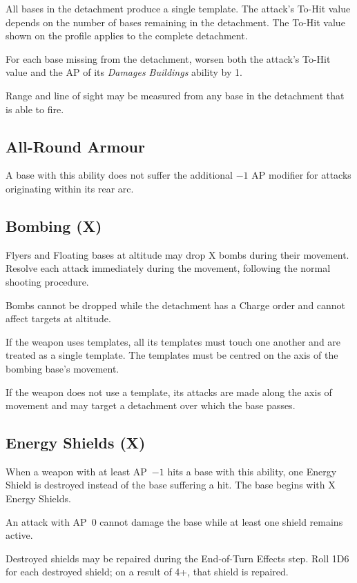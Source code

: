 All bases in the detachment produce a single template. The attack's To-Hit value depends on the number of bases remaining in the detachment. The To-Hit value shown on the profile applies to the complete detachment.

For each base missing from the detachment, worsen both the attack's To-Hit value and the AP of its \textit{Damages Buildings} ability by 1.

Range and line of sight may be measured from any base in the detachment that is able to fire.

\subsection{All-Round Armour}

A base with this ability does not suffer the additional $-1$ AP modifier for attacks originating within its rear arc.

\subsection{Bombing (X)}

Flyers and Floating bases at altitude may drop X bombs during their movement. Resolve each attack immediately during the movement, following the normal shooting procedure.

Bombs cannot be dropped while the detachment has a Charge order and cannot affect targets at altitude.

If the weapon uses templates, all its templates must touch one another and are treated as a single template. The templates must be centred on the axis of the bombing base's movement.

If the weapon does not use a template, its attacks are made along the axis of movement and may target a detachment over which the base passes.

\subsection{Energy Shields (X)}

When a weapon with at least AP~$-1$ hits a base with this ability, one Energy Shield is destroyed instead of the base suffering a hit. The base begins with X Energy Shields.

An attack with AP~0 cannot damage the base while at least one shield remains active.

Destroyed shields may be repaired during the End-of-Turn Effects step. Roll 1D6 for each destroyed shield; on a result of 4+, that shield is repaired.

